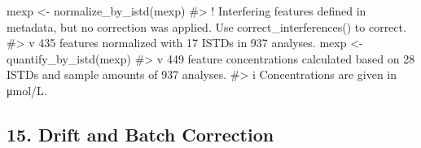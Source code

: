 \documentclass[
  letterpaper,
  DIV=11,
  numbers=noendperiod]{scrartcl}
\newenvironment{Shaded}{\begin{snugshade}}{\end{snugshade}}
\newcommand{\CommentTok}[1]{\textcolor[rgb]{0.37,0.37,0.37}{#1}}
\newcommand{\FunctionTok}[1]{\textcolor[rgb]{0.28,0.35,0.67}{#1}}
\newcommand{\NormalTok}[1]{\textcolor[rgb]{0.00,0.23,0.31}{#1}}
\newcommand{\OtherTok}[1]{\textcolor[rgb]{0.00,0.23,0.31}{#1}}
\begin{document}
\begin{Shaded}
\begin{Highlighting}[]
\NormalTok{mexp }\OtherTok{\textless{}{-}} \FunctionTok{normalize\_by\_istd}\NormalTok{(mexp) }
\CommentTok{\#\textgreater{} ! Interfering features defined in metadata, but no correction was applied. Use \textasciigrave{}correct\_interferences()\textasciigrave{} to correct.}
\CommentTok{\#\textgreater{} v 435 features normalized with 17 ISTDs in 937 analyses.}
\NormalTok{mexp }\OtherTok{\textless{}{-}} \FunctionTok{quantify\_by\_istd}\NormalTok{(mexp) }
\CommentTok{\#\textgreater{} v 449 feature concentrations calculated based on 28 ISTDs and sample amounts of 937 analyses.}
\CommentTok{\#\textgreater{} i Concentrations are given in μmol/L.}
\end{Highlighting}
\end{Shaded}

\subsection{15. Drift and Batch
Correction}\label{drift-and-batch-correction}
\end{document}
